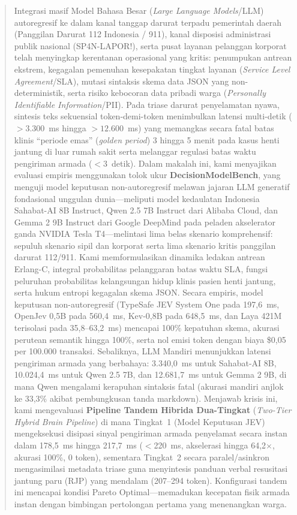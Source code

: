 \documentclass[journal,compsoc]{IEEEtran}
\begin{document}
{\begin{abstract}
Integrasi masif Model Bahasa Besar (\textit{Large Language Models}/LLM) autoregresif ke dalam kanal tanggap darurat terpadu pemerintah daerah (Panggilan Darurat 112 Indonesia / 911), kanal disposisi administrasi publik nasional (SP4N-LAPOR!), serta pusat layanan pelanggan korporat telah menyingkap kerentanan operasional yang kritis: penumpukan antrean ekstrem, kegagalan pemenuhan kesepakatan tingkat layanan (\textit{Service Level Agreement}/SLA), mutasi sintaksis skema data JSON yang non-deterministik, serta risiko kebocoran data pribadi warga (\textit{Personally Identifiable Information}/PII). Pada triase darurat penyelamatan nyawa, sintesis teks sekuensial token-demi-token menimbulkan latensi multi-detik ($>3.300$~ms hingga $>12.600$~ms) yang memangkas secara fatal batas klinis ``periode emas'' (\textit{golden period}) 3 hingga 5 menit pada kasus henti jantung di luar rumah sakit serta melanggar regulasi batas waktu pengiriman armada ($<3$~detik). Dalam makalah ini, kami menyajikan evaluasi empiris menggunakan tolok ukur \textbf{DecisionModelBench}, yang menguji model keputusan non-autoregresif melawan jajaran LLM generatif fondasional unggulan dunia—meliputi model kedaulatan Indonesia Sahabat-AI 8B Instruct, Qwen 2.5 7B Instruct dari Alibaba Cloud, dan Gemma 2 9B Instruct dari Google DeepMind pada peladen akselerator ganda NVIDIA Tesla T4—melintasi lima belas skenario komprehensif: sepuluh skenario sipil dan korporat serta lima skenario kritis panggilan darurat 112/911. Kami memformulasikan dinamika ledakan antrean Erlang-C, integral probabilitas pelanggaran batas waktu SLA, fungsi peluruhan probabilitas kelangsungan hidup klinis pasien henti jantung, serta hukum entropi kegagalan skema JSON. Secara empiris, model keputusan non-autoregresif (TypeSafe JEV System One pada 197,6~ms, OpenJev 0,5B pada 560,4~ms, Kev-0,8B pada 648,5~ms, dan Laya 421M terisolasi pada 35,8--63,2~ms) mencapai 100\% kepatuhan skema, akurasi perutean semantik hingga 100\%, serta nol emisi token dengan biaya \$0,05 per 100.000 transaksi. Sebaliknya, LLM Mandiri menunjukkan latensi pengiriman armada yang berbahaya: 3.340,0~ms untuk Sahabat-AI 8B, 10.024,4~ms untuk Qwen 2.5 7B, dan 12.681,7~ms untuk Gemma 2 9B, di mana Qwen mengalami kerapuhan sintaksis fatal (akurasi mandiri anjlok ke 33,3\% akibat pembungkusan tanda markdown). Menjawab krisis ini, kami mengevaluasi \textbf{Pipeline Tandem Hibrida Dua-Tingkat} (\textit{Two-Tier Hybrid Brain Pipeline}) di mana Tingkat~1 (Model Keputusan JEV) mengeksekusi disipasi sinyal pengiriman armada penyelamat secara instan dalam 178,5~ms hingga 217,7~ms ($<$220~ms, akselerasi hingga 64,2$\times$, akurasi 100\%, 0 token), sementara Tingkat~2 secara paralel/asinkron mengasimilasi metadata triase guna menyintesis panduan verbal resusitasi jantung paru (RJP) yang mendalam (207--294 token). Konfigurasi tandem ini mencapai kondisi Pareto Optimal—memadukan kecepatan fisik armada instan dengan bimbingan pertolongan pertama yang menenangkan warga.
\end{abstract}

}
\end{document}
